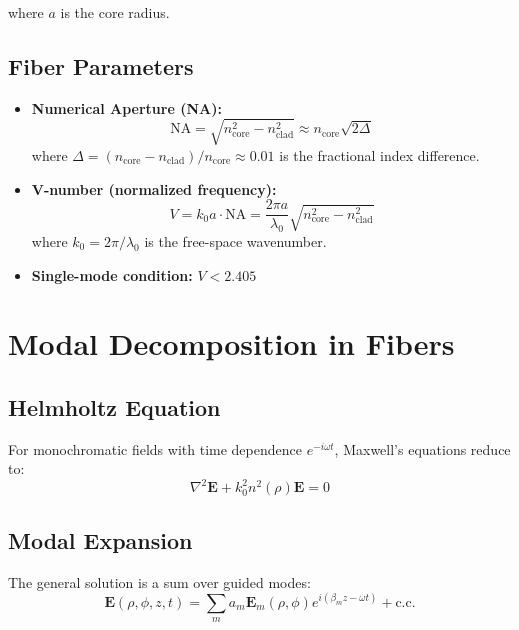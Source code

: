 \documentclass[12pt,a4paper]{article}
\begin{document}
where $a$ is the core radius.

\subsection{Fiber Parameters}

\begin{itemize}[leftmargin=*]
\item \textbf{Numerical Aperture (NA):}
\begin{equation}
\text{NA} = \sqrt{n_{\text{core}}^2 - n_{\text{clad}}^2} \approx n_{\text{core}} \sqrt{2\Delta}
\end{equation}
where $\Delta = (n_{\text{core}} - n_{\text{clad}})/n_{\text{core}} \approx 0.01$ is the fractional index difference.

\item \textbf{V-number (normalized frequency):}
\begin{equation}
V = k_0 a \cdot \text{NA} = \frac{2\pi a}{\lambda_0} \sqrt{n_{\text{core}}^2 - n_{\text{clad}}^2}
\end{equation}
where $k_0 = 2\pi/\lambda_0$ is the free-space wavenumber.

\item \textbf{Single-mode condition:} $V < 2.405$
\end{itemize}

\section{Modal Decomposition in Fibers}

\subsection{Helmholtz Equation}

For monochromatic fields with time dependence $e^{-i\omega t}$, Maxwell's equations reduce to:
\begin{equation}
\nabla^2 \mathbf{E} + k_0^2 n^2(\rho) \mathbf{E} = 0 \label{eq:helmholtz}
\end{equation}

\subsection{Modal Expansion}

The general solution is a sum over guided modes:
\begin{equation}
\mathbf{E}(\rho, \phi, z, t) = \sum_{m} a_m \mathbf{E}_m(\rho, \phi) e^{i(\beta_m z - \omega t)} + \text{c.c.} \label{eq:modal_expansion}
\end{equation}
\end{document}
